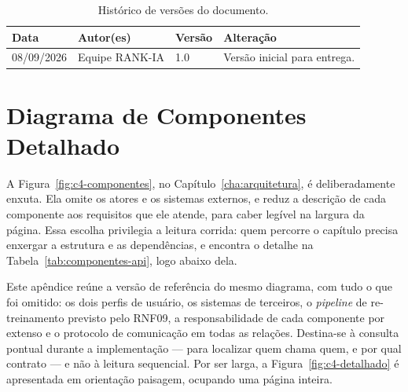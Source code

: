 \documentclass[a4paper,12pt,oneside,openany]{book}
\begin{document}
\begin{table}[H]
\centering
\caption{Histórico de versões do documento.}
\begin{tabularx}{0.95\textwidth}{p{} p{} p{} X}
\toprule
\textbf{Data} & \textbf{Autor(es)} & \textbf{Versão} & \textbf{Alteração} \\
\midrule
08/09/2026 & Equipe RANK-IA & 1.0 & Versão inicial para entrega. \\
\bottomrule
\end{tabularx}
\end{table}

%
%

\appendix
\renewcommand{\chaptername}{\appendixname}

\chapter{Diagrama de Componentes Detalhado}\label{ape:c4-detalhado}

A Figura~\ref{fig:c4-componentes}, no Capítulo~\ref{cha:arquitetura}, é
deliberadamente enxuta. Ela omite os atores e os sistemas externos, e reduz a
descrição de cada componente aos requisitos que ele atende, para caber legível
na largura da página. Essa escolha privilegia a leitura corrida: quem percorre
o capítulo precisa enxergar a estrutura e as dependências, e encontra o detalhe
na Tabela~\ref{tab:componentes-api}, logo abaixo dela.

Este apêndice reúne a versão de referência do mesmo diagrama, com tudo o que
foi omitido: os dois perfis de usuário, os sistemas de terceiros, o
\textit{pipeline} de re-treinamento previsto pelo RNF09, a responsabilidade de
cada componente por extenso e o protocolo de comunicação em todas as relações.
Destina-se à consulta pontual durante a implementação --- para localizar quem
chama quem, e por qual contrato --- e não à leitura sequencial. Por ser larga, a
Figura~\ref{fig:c4-detalhado} é apresentada em orientação paisagem, ocupando uma
página inteira.
\end{document}
